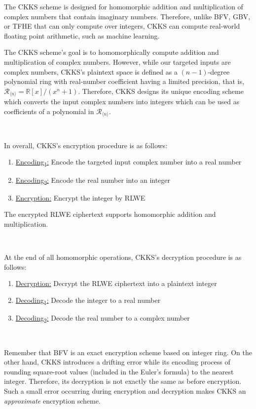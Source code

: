 The CKKS scheme is designed for homomorphic addition and multiplication of complex numbers that contain imaginary numbers. Therefore, unlike BFV, GBV, or TFHE that can only compute over integers, CKKS can compute real-world floating point arithmetic, such as machine learning. 


The CKKS scheme's goal is to homomorphically compute addition and multiplication of complex numbers. However, while our targeted inputs are complex numbers, CKKS's plaintext space is defined as a $(n-1)$-degree polynomial ring with real-number coefficient having a limited precision, that is, $\mathcal{R}_{\langle n \rangle} = \mathbb{R}[x] / (x^n + 1)$. Therefore, CKKS designs its unique encoding scheme which converts the input complex numbers into integers which can be used as coefficients of a polynomial in $\mathcal{R}_{\langle n \rangle}$. 


$ $

\noindent In overall, CKKS's encryption procedure is as follows:

\begin{enumerate}
\item \underline{\textsf{Encoding\textsubscript{1}}:} Encode the targeted input complex number into a real number
\item \underline{\textsf{Encoding\textsubscript{2}}:} Encode the real number into an integer
\item \underline{\textsf{Encryption}:} Encrypt the integer by RLWE 
\end{enumerate}
The encrypted RLWE ciphertext supports homomorphic addition and multiplication. 

$ $

\noindent At the end of all homomorphic operations, CKKS's decryption procedure is as follows: 

\begin{enumerate}
\item \underline{\textsf{Decryption}:} Decrypt the RLWE ciphertext into a plaintext integer
\item \underline{\textsf{Decoding\textsubscript{1}}:} Decode the integer to a real number
\item \underline{\textsf{Decoding\textsubscript{2}}:} Decode the real number to a complex number
\end{enumerate}

$ $


Remember that BFV is an exact encryption scheme based on integer ring. On the other hand, CKKS introduces a drifting error while its encoding process of rounding square-root values (included in the Euler's formula) to the nearest integer. Therefore, its decryption is not exactly the same as before encryption. Such a small error occurring during encryption and decryption makes CKKS an \textit{approximate} encryption scheme. 

